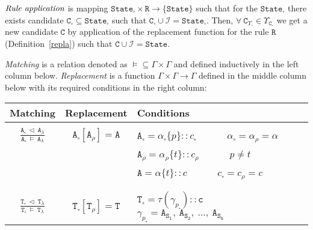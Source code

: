 \documentclass{entcs}
\renewcommand{\~}[0]{\texttildelow}
\begin{document}
\begin{defn} \label{app}
$\emph{Rule application}$ is mapping $\mathtt{State}_{\square} \times \mathtt{R} \rightarrow \{\mathtt{State}\}$ such that for the $\mathtt{State}_{\square}$ there exists candidate $\mathtt{C}_{\square} \subseteq \mathtt{State}_{\square}$ such that $\mathtt{C}_{\square} \cup \mathcal{I} = \mathtt{State}_{\square}$. Then, $\forall ~\mathtt{C}_{\Upsilon_{\square}} \in \Upsilon_{\mathtt{C}_{\square}}$ we get a new candidate $\mathtt{C}$ by application of the replacement function for the rule $\mathtt{R}$ (Definition~\ref{repla}) such that $\mathtt{C} \cup \mathcal{I} = \mathtt{State}$.
\end{defn}

\begin{defn} \label{repla}
$ $ \\
\emph{Matching} is a relation denoted as $\models \subseteq \Gamma \times \Gamma$ and defined inductively in the left column below.
    \emph{Replacement} is a function $\Gamma \times \Gamma \rightarrow \Gamma$ defined in the middle column below with its required conditions in the right column:

    \begin{center}
{\scriptsize
\begin{tabular}{ c | | c | l }
	Matching & Replacement & Conditions \\

	\hline
	& & \\[0.02cm]

    $ \frac{\mathtt{A}_{\square}~\lhd~\mathtt{A}_{\lambda}}{\mathtt{A}_{\square}~\models~\mathtt{A}_{\lambda}}$ & 
    $ \mathtt{A}_{\square}[\mathtt{A}_\rho] = \mathtt{A} $ & 
    $ \mathtt{A}_{\square} = \alpha_{\square}\{p\}::c_{\square}$ ~~~~~ $ \alpha_{\square} = \alpha_\rho = \alpha$ \\

     &  & $\mathtt{A}_\rho = \alpha_\rho\{t\}::c_\rho$ ~~~~~ $p \neq t$ \\
     &  & $\mathtt{A} = \alpha\{t\}::c$ ~~~~~ $ c_{\square} = c_\rho = c$\\

    & & \\[0.02cm]
    \hline
    & & \\[0.02cm]

    $\frac{\mathtt{T}_{\square}~\lhd~\mathtt{T}_{\lambda}}{\mathtt{T}_{\square}~\models~\mathtt{T}_{\lambda}}$ & 
    $ \mathtt{T}_{\square}[\mathtt{T}_\rho] = \mathtt{T} $ & 
    $ \mathtt{T}_{\square} = \tau(\gamma_{p_{\square}})::\mathtt{c}$ ~~~~~ $ \gamma_{p_{\square}} = \mathtt{A}_\mathtt{S_1},~ \mathtt{A}_\mathtt{S_2},~ ..., ~\mathtt{A}_\mathtt{S_n} $\\


\end{tabular}}
\end{center}
\end{defn}
\end{document}
